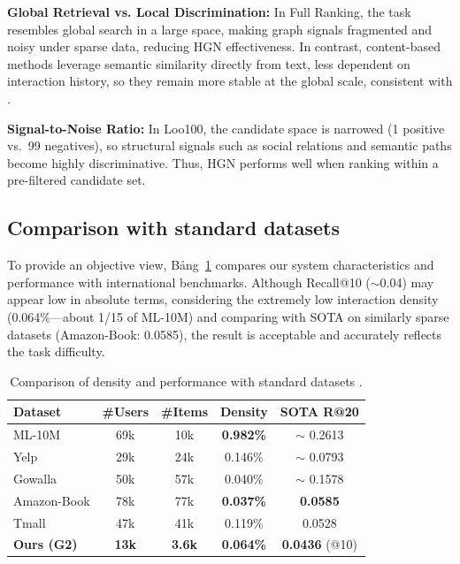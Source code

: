 \documentclass[11pt]{article}
\newcommand{\tabref}[1]{Bảng~\ref{#1}}
\begin{document}
\textbf{Global Retrieval vs. Local Discrimination:}
In Full Ranking, the task resembles global search in a large space,
making graph signals fragmented and noisy under sparse data,
reducing HGN effectiveness.
In contrast, content-based methods leverage semantic similarity directly from text,
less dependent on interaction history,
so they remain more stable at the global scale,
consistent with \citet{sun2023evaluation}.

\textbf{Signal-to-Noise Ratio:}
In Loo100, the candidate space is narrowed (1 positive vs.\ 99 negatives),
so structural signals such as social relations and semantic paths
become highly discriminative.
Thus, HGN performs well when ranking within a pre-filtered candidate set.

\subsection{Comparison with standard datasets}
To provide an objective view, \tabref{tab:dataset-comparison} compares our system characteristics and performance with international benchmarks. Although Recall@10 ($\sim$0.04) may appear low in absolute terms, considering the extremely low interaction density (0.064\%—about 1/15 of ML-10M) and comparing with SOTA on similarly sparse datasets (Amazon-Book: 0.0585), the result is acceptable and accurately reflects the task difficulty.

\begin{table}[!htbp]
    \centering
    \footnotesize
    \setlength{\tabcolsep}{3.4pt}
    \begin{tabular}{l|c|c|c|c}
        \toprule
        \textbf{Dataset}   & \textbf{\#Users} & \textbf{\#Items} & \textbf{Density} & \textbf{SOTA R@20}    \\
        \midrule
        ML-10M             & 69k              & 10k              & \textbf{0.982\%} & $\sim$ 0.2613         \\
        Yelp               & 29k              & 24k              & 0.146\%          & $\sim$ 0.0793         \\
        Gowalla            & 50k              & 57k              & 0.040\%          & $\sim$ 0.1578         \\
        Amazon-Book        & 78k              & 77k              & \textbf{0.037\%} & \textbf{0.0585}       \\
        Tmall              & 47k              & 41k              & 0.119\%          & 0.0528                \\
        \midrule
        \textbf{Ours (G2)} & \textbf{13k}     & \textbf{3.6k}    & \textbf{0.064\%} & \textbf{0.0436} (@10) \\
        \bottomrule
    \end{tabular}
    \caption{Comparison of density and performance with standard datasets \citet{he2020lightgcn, yu2022graph}.}
    \label{tab:dataset-comparison}
\end{table}
\end{document}
